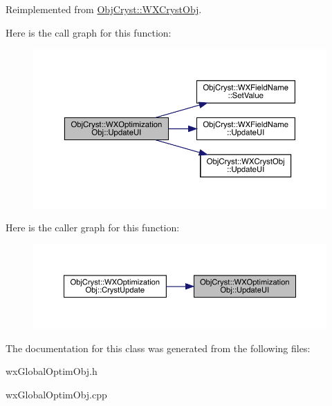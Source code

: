 Reimplemented from \mbox{\hyperlink{class_obj_cryst_1_1_w_x_cryst_obj_a6578681b14426e8a844ac6e4ca7fafea}{Obj\+Cryst\+::\+W\+X\+Cryst\+Obj}}.

Here is the call graph for this function\+:
\nopagebreak
\begin{figure}[H]
\begin{center}
\leavevmode
\includegraphics[width=350pt]{class_obj_cryst_1_1_w_x_optimization_obj_a4643e15059bdd46e65c0ac18d7491787_cgraph}
\end{center}
\end{figure}
Here is the caller graph for this function\+:
\nopagebreak
\begin{figure}[H]
\begin{center}
\leavevmode
\includegraphics[width=350pt]{class_obj_cryst_1_1_w_x_optimization_obj_a4643e15059bdd46e65c0ac18d7491787_icgraph}
\end{center}
\end{figure}


The documentation for this class was generated from the following files\+:\begin{DoxyCompactItemize}
\item 
wx\+Global\+Optim\+Obj.\+h\item 
wx\+Global\+Optim\+Obj.\+cpp\end{DoxyCompactItemize}
